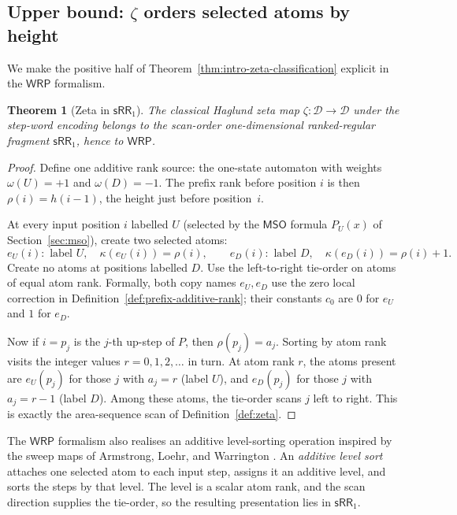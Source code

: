 \documentclass[11pt]{article}
\newtheorem{theorem}{Theorem}[section]
\theoremstyle{definition}
\newcommand{\D}{\mathcal D}
\newcommand{\WRP}{\mathsf{WRP}}
\newcommand{\SWR}{\mathsf{sRR}_1}
\newcommand{\MSO}{\mathsf{MSO}}
\begin{document}
\subsection[Upper bound: zeta orders selected atoms by height]
{Upper bound: $\zeta$ orders selected atoms by height}\label{sec:zeta-positive}

We make the positive half of Theorem~\ref{thm:intro-zeta-classification}
explicit in the $\WRP$ formalism.

\begin{theorem}[Zeta in $\SWR$]\label{thm:zeta-wrp}
The classical Haglund zeta map $\zeta\colon\D\to\D$ under the step-word
encoding belongs to the scan-order one-dimensional ranked-regular fragment
$\SWR$, hence to $\WRP$.
\end{theorem}

\begin{proof}
Define one additive rank source: the one-state automaton with weights
$\omega(U)=+1$ and $\omega(D)=-1$.  The prefix rank before position $i$
is then $\rho(i)=h(i-1)$, the height just before position~$i$.

At every input position $i$ labelled $U$ (selected by the $\MSO$ formula
$P_U(x)$ of Section~\ref{sec:mso}), create two selected atoms:
\[
   e_U(i)\colon\text{ label }U,\quad \kappa(e_U(i))=\rho(i),
   \qquad
   e_D(i)\colon\text{ label }D,\quad \kappa(e_D(i))=\rho(i)+1.
\]
Create no atoms at positions labelled $D$.  Use the left-to-right tie-order
on atoms of equal atom rank.  Formally, both copy names $e_U,e_D$ use the zero local
correction in Definition~\ref{def:prefix-additive-rank}; their constants $c_0$
are $0$ for $e_U$ and $1$ for $e_D$.

Now if $i=p_j$ is the $j$-th up-step of $P$, then $\rho(p_j)=a_j$.  Sorting
by atom rank visits the integer values $r=0,1,2,\ldots$ in turn.  At atom rank
$r$, the atoms
present are $e_U(p_j)$ for those $j$ with $a_j=r$ (label $U$), and
$e_D(p_j)$ for those $j$ with $a_j=r-1$ (label $D$).  Among these atoms, the
tie-order scans $j$ left to right.  This is exactly the area-sequence scan
of Definition~\ref{def:zeta}.
\end{proof}

The $\WRP$ formalism also realises an additive level-sorting operation inspired
by the sweep maps of Armstrong, Loehr, and Warrington
\cite{ArmstrongLoehrWarrington2015,ArmstrongLoehrWarrington2016}.  An
\emph{additive level sort} attaches one selected atom to each input step, assigns
it an additive level, and sorts the steps by that level.  The level is a scalar
atom rank, and the scan direction supplies the tie-order, so the resulting
presentation lies in $\SWR$.
\end{document}
